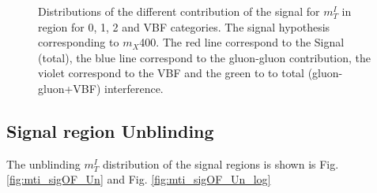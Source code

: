 \begin{figure}[htbp]
{}
\caption{Distributions of the different contribution of the signal for  $m_T^I$ in region for 0, 1, 2 and VBF categories. The  signal hypothesis corresponding to $m_X $400. The red line correspond to the Signal (total), the blue line correspond to the gluon-gluon contribution, the violet correspond to the VBF and the green to to total (gluon-gluon+VBF) interference.}
    \label{fig:mti_Diff_contrib400}
\end{figure}






\subsection{Signal region Unblinding}
The unblinding  $m_T^I$ distribution of the signal regions is shown is Fig. \ref{fig:mti_sigOF_Un} and Fig. \ref{fig:mti_sigOF_Un_log} 

